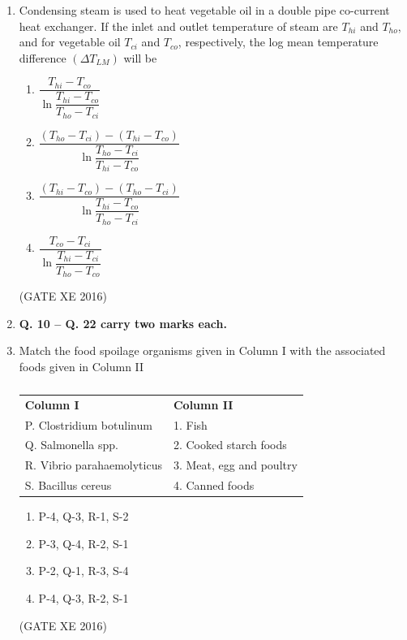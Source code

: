 \documentclass[12pt]{article}
\begin{document}
\begin{enumerate}
\item Condensing steam is used to heat vegetable oil in a double pipe co-current heat exchanger. If the inlet and outlet temperature of steam are $T_{hi}$ and $T_{ho}$, and for vegetable oil $T_{ci}$ and $T_{co}$, respectively, the log mean temperature difference $(\Delta T_{LM})$ will be
\begin{multicols}{2}
\begin{enumerate}
\item $\dfrac{T_{hi}-T_{co}}{\ln \dfrac{T_{hi}-T_{co}}{T_{ho}-T_{ci}}}$
\item $\dfrac{(T_{ho}-T_{ci})-(T_{hi}-T_{co})}{\ln \dfrac{T_{ho}-T_{ci}}{T_{hi}-T_{co}}}$
\item $\dfrac{(T_{hi}-T_{co})-(T_{ho}-T_{ci})}{\ln \dfrac{T_{hi}-T_{co}}{T_{ho}-T_{ci}}}$
\item $\dfrac{T_{co}-T_{ci}}{\ln \dfrac{T_{hi}-T_{ci}}{T_{ho}-T_{co}}}$
\end{enumerate}
\end{multicols}
(GATE XE 2016)

\item[] \textbf{Q. 10 – Q. 22 carry two marks each. }

\item Match the food spoilage organisms given in Column I with the associated foods given in Column II

\begin{table}[H]
\centering
\begin{tabular}{ll}
\textbf{Column I} & \textbf{Column II} \\
P. Clostridium botulinum & 1. Fish \\
Q. Salmonella spp. & 2. Cooked starch foods \\
R. Vibrio parahaemolyticus & 3. Meat, egg and poultry \\
S. Bacillus cereus & 4. Canned foods \\
\end{tabular}
\caption{}
\label{}
\end{table}

\begin{multicols}{2}
\begin{enumerate}
\item P-4, Q-3, R-1, S-2
\item P-3, Q-4, R-2, S-1
\item P-2, Q-1, R-3, S-4
\item P-4, Q-3, R-2, S-1
\end{enumerate}
\end{multicols}
(GATE XE 2016)


\end{enumerate}
\end{document}
